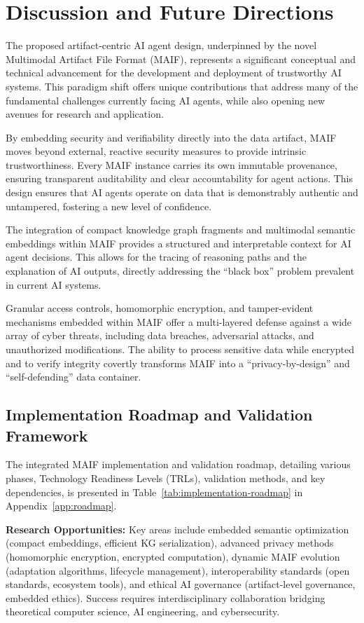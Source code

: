 \documentclass[conference]{IEEEtran}
\begin{document}
\section{Discussion and Future Directions}
\label{sec:discussion}

The proposed artifact-centric AI agent design, underpinned by the novel Multimodal Artifact File Format (MAIF), represents a significant conceptual and technical advancement for the development and deployment of trustworthy AI systems. This paradigm shift offers unique contributions that address many of the fundamental challenges currently facing AI agents, while also opening new avenues for research and application.

By embedding security and verifiability directly into the data artifact, MAIF moves beyond external, reactive security measures to provide intrinsic trustworthiness. Every MAIF instance carries its own immutable provenance, ensuring transparent auditability and clear accountability for agent actions\cite{ref4}. This design ensures that AI agents operate on data that is demonstrably authentic and untampered, fostering a new level of confidence.

The integration of compact knowledge graph fragments and multimodal semantic embeddings within MAIF provides a structured and interpretable context for AI agent decisions\cite{ref26}. This allows for the tracing of reasoning paths and the explanation of AI outputs, directly addressing the ``black box'' problem prevalent in current AI systems\cite{ref4}.

Granular access controls, homomorphic encryption, and tamper-evident mechanisms embedded within MAIF offer a multi-layered defense against a wide array of cyber threats, including data breaches, adversarial attacks, and unauthorized modifications\cite{ref69}. The ability to process sensitive data while encrypted and to verify integrity covertly transforms MAIF into a ``privacy-by-design'' and ``self-defending'' data container.


\subsection{Implementation Roadmap and Validation Framework}
The integrated MAIF implementation and validation roadmap, detailing various phases, Technology Readiness Levels (TRLs), validation methods, and key dependencies, is presented in Table~\ref{tab:implementation-roadmap} in Appendix~\ref{app:roadmap}.

\textbf{Research Opportunities:} Key areas include embedded semantic optimization (compact embeddings, efficient KG serialization), advanced privacy methods (homomorphic encryption, encrypted computation), dynamic MAIF evolution (adaptation algorithms, lifecycle management), interoperability standards (open standards, ecosystem tools), and ethical AI governance (artifact-level governance, embedded ethics). Success requires interdisciplinary collaboration bridging theoretical computer science, AI engineering, and cybersecurity.
\end{document}
